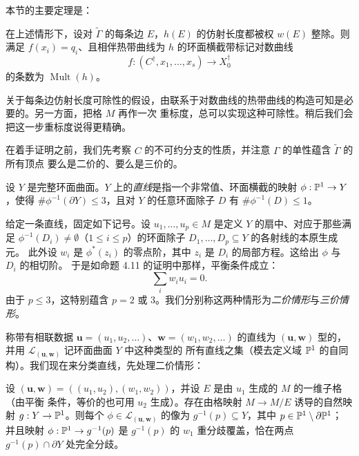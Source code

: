本节的主要定理是：

\begin{theorem}
在上述情形下，设对 $\widetilde{\Gamma}$ 的每条边 $E$，$h(E)$ 的仿射长度都被权 $w(E)$ 整除。则满足
$f(x_i) = q_i$、且相伴热带曲线为 $h$ 的环面横截带标记对数曲线
\[
f : (C^{\dagger},x_1,\dots,x_s) \to X_0^{\dagger}
\]
的条数为 $\operatorname{Mult}(h)$。
\end{theorem}

\begin{remark}
关于每条边仿射长度可除性的假设，由联系于对数曲线的热带曲线的构造可知是必要的。另一方面，把格 $M$ 再作一次
重标度，总可以实现这种可除性。稍后我们会把这一步重标度说得更精确。
\end{remark}

在着手证明之前，我们先考察 $C$ 的不可约分支的性质，并注意 $\Gamma$ 的单性蕴含 $\widetilde{\Gamma}$ 的所有顶点
要么是二价的、要么是三价的。

\begin{definition}
设 $Y$ 是完整环面曲面。$Y$ 上的\emph{直线}是指一个非常值、环面横截的映射 $\phi : \mathbb{P}^1 \to Y$，使得
$\#\phi^{-1}(\partial Y)\le3$，且对 $Y$ 的任意环面除子 $D$ 有 $\#\phi^{-1}(D)\le1$。
\end{definition}

给定一条直线，固定如下记号。设 $u_1,\dots,u_p\in M$ 是定义 $Y$ 的扇中、对应于那些满足
$\phi^{-1}(D_i)\ne\emptyset$（$1\le i\le p$）的环面除子 $D_1,\dots,D_p\subseteq Y$ 的各射线的本原生成元。
此外设 $w_i$ 是 $\phi^*(z_i)$ 的零点阶，其中 $z_i$ 是 $D_i$ 的局部方程。这给出 $\phi$ 与 $D_i$ 的相切阶。
于是如命题 4.11 的证明中那样，平衡条件成立：
\[
\sum_i w_iu_i = 0.
\]
由于 $p\le3$，这特别蕴含 $p = 2$ 或 $3$。我们分别称这两种情形为\emph{二价情形}与\emph{三价情形}。


称带有相联数据 $\mathbf{u} = (u_1,u_2,\dots)$、$\mathbf{w} = (w_1,w_2,\dots)$ 的直线为
$(\mathbf{u},\mathbf{w})$ 型的，并用 $\mathcal{L}_{(\mathbf{u},\mathbf{w})}$ 记环面曲面 $Y$ 中这种类型的
所有直线之集（模去定义域 $\mathbb{P}^1$ 的自同构）。我们现在来分类直线，先处理二价情形：

\begin{lemma}
设 $(\mathbf{u},\mathbf{w}) = ((u_1,u_2),(w_1,w_2))$，并设 $E$ 是由 $u_1$ 生成的 $M$ 的一维子格（由平衡
条件，等价的也可用 $u_2$ 生成）。存在由格映射 $M \to M/E$ 诱导的自然映射 $g : Y \to \mathbb{P}^1$。则每个
$\phi\in\mathcal{L}_{(\mathbf{u},\mathbf{w})}$ 的像为 $g^{-1}(p)\subseteq Y$，其中 $p\in\mathbb{P}^1\setminus\partial\mathbb{P}^1$；
并且映射 $\phi : \mathbb{P}^1 \to g^{-1}(p)$ 是 $g^{-1}(p)$ 的 $w_1$ 重分歧覆盖，恰在两点
$g^{-1}(p)\cap\partial Y$ 处完全分歧。
\end{lemma}

